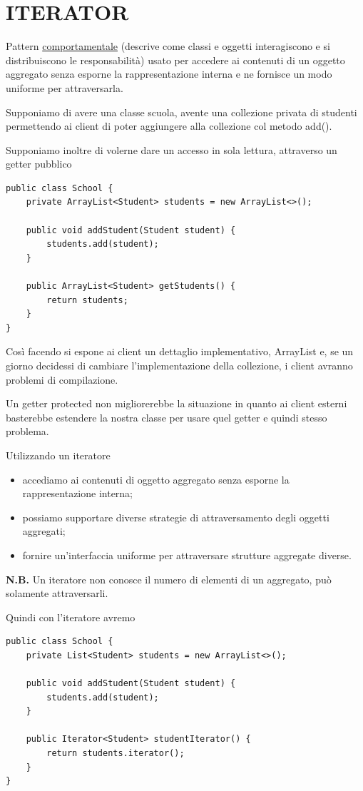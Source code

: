 \chapter{ITERATOR}

Pattern \underline{comportamentale} (descrive come classi e oggetti interagiscono e si distribuiscono le responsabilità) usato per accedere ai contenuti di un oggetto 
aggregato senza esporne la rappresentazione interna e ne fornisce un modo uniforme per attraversarla.

Supponiamo di avere una classe scuola, avente una collezione privata di studenti permettendo ai client di poter aggiungere alla collezione col metodo add().

Supponiamo inoltre di volerne dare un accesso in sola lettura, attraverso un getter pubblico
\begin{lstlisting}
public class School {
    private ArrayList<Student> students = new ArrayList<>();
    
    public void addStudent(Student student) {
        students.add(student);
    }
    
    public ArrayList<Student> getStudents() {
        return students;
    }
}
\end{lstlisting}

Così facendo si espone ai client un dettaglio implementativo, ArrayList e, se un giorno decidessi di cambiare l'implementazione della collezione, i client avranno 
problemi di compilazione.

Un getter protected non migliorerebbe la situazione in quanto ai client esterni basterebbe estendere la nostra classe per usare quel getter e quindi stesso problema.

Utilizzando un iteratore
\begin{itemize}
    \item accediamo ai contenuti di oggetto aggregato senza esporne la rappresentazione interna;
    \item possiamo supportare diverse strategie di attraversamento degli oggetti aggregati;
    \item fornire un’interfaccia uniforme per attraversare strutture aggregate diverse.
\end{itemize}

\textbf{N.B.} Un iteratore non conosce il numero di elementi di un aggregato, può solamente attraversarli.

Quindi con l'iteratore avremo
\begin{lstlisting}
public class School {
    private List<Student> students = new ArrayList<>();
    
    public void addStudent(Student student) {
        students.add(student);
    }

    public Iterator<Student> studentIterator() {
        return students.iterator();
    }
}
\end{lstlisting}

